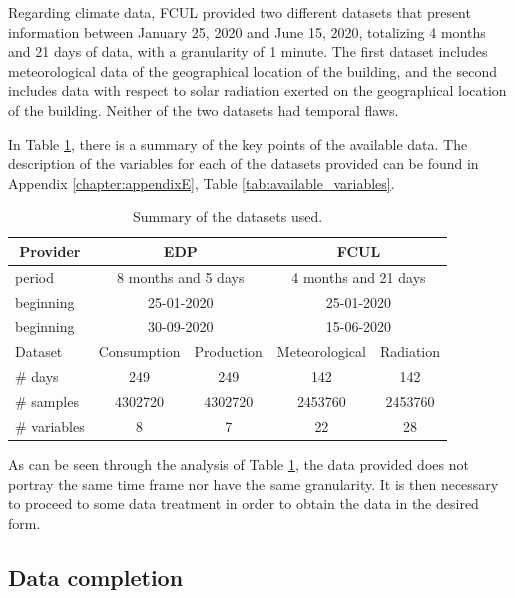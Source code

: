 Regarding climate data, \ac{FCUL} provided two different datasets that present information between January 25, 2020 and June 15, 2020, totalizing 4 months and 21 days of data, with a granularity of 1 minute. The first dataset includes meteorological data of the geographical location of the building, and the second includes data with respect to solar radiation exerted on the geographical location of the building. Neither of the two datasets had temporal flaws.

In Table \ref{table2}, there is a summary of the key points of the available data. The description of the variables for each of the datasets provided can be found in Appendix \ref{chapter:appendixE}, Table \ref{tab:available_variables}.

\begin{table}[htbp]
  \centering
  \caption{Summary of the datasets used.}
    \begin{tabular}{l|c|c|c|c|}
    \multicolumn{1}{c|}{\textbf{Provider}} & \multicolumn{2}{c|}{\textbf{EDP}} & \multicolumn{2}{c|}{\textbf{FCUL}} \\
    \midrule
    period & \multicolumn{2}{c|}{8 months and 5 days} & \multicolumn{2}{c|}{4 months and 21 days} \\
    beginning & \multicolumn{2}{c|}{25-01-2020} & \multicolumn{2}{c|}{25-01-2020} \\
    beginning & \multicolumn{2}{c|}{30-09-2020} & \multicolumn{2}{c|}{15-06-2020} \\
    \midrule
    Dataset & Consumption & Production & Meteorological & Radiation \\
    \# days & 249 & 249 & 142 & 142 \\
    \# samples & 4302720 & 4302720 & 2453760 & 2453760 \\
    \# variables & 8 & 7 & 22 & 28 \\
    \end{tabular}%
  \label{table2}%
\end{table}%


As can be seen through the analysis of Table \ref{table2}, the data provided does not portray the same time frame nor have the same granularity. It is then necessary to proceed to some data treatment in order to obtain the data in the desired form.

\subsection{Data completion}\label{chap3:subsec:data_completion}

